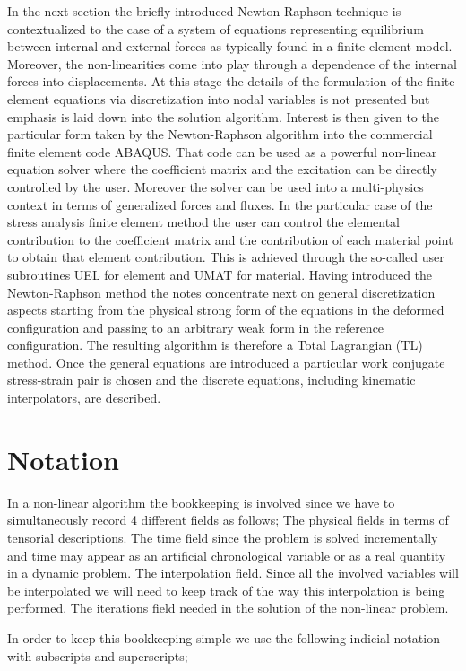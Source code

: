 In the next section the briefly introduced Newton-Raphson technique is contextualized to the case of a system of equations representing equilibrium between internal and external forces as typically found in a finite element model.  Moreover, the non-linearities come into play through a dependence of the internal forces into displacements.  At this stage the details of the formulation of the finite element equations via discretization into nodal variables is not presented but emphasis is laid down into the solution algorithm.  Interest is then given to the particular form taken by the Newton-Raphson algorithm into the commercial finite element code ABAQUS.  That code can be used as a powerful non-linear equation solver where the coefficient matrix and the excitation can be directly controlled by the user.  Moreover the solver can be used into a multi-physics context in terms of generalized forces and fluxes.  In the particular case of the stress analysis finite element method the user can control the elemental contribution to the coefficient matrix and the contribution of each material point to obtain that element contribution.  This is achieved through the so-called user subroutines UEL  for element and UMAT  for material.  Having introduced the Newton-Raphson method the notes concentrate next on general discretization aspects starting from the physical strong form of the equations in the deformed configuration and passing to an arbitrary weak form in the reference configuration.  The resulting algorithm is therefore a Total Lagrangian (TL) method.  Once the general equations are introduced a particular work conjugate stress-strain pair is chosen and the discrete equations, including kinematic interpolators, are described.

\section*{Notation}
In a non-linear algorithm the bookkeeping is involved since we have to simultaneously record 4 different fields as follows;
	The physical fields in terms of tensorial descriptions.
	The time field since the problem is solved incrementally 	and time may appear as an artificial chronological variable 	or as a real quantity in a dynamic problem.
	The interpolation field.  Since all the involved variables will be interpolated we will need to keep track of the way 	this interpolation is being performed.
	The iterations field needed in the solution of the non-linear problem.

In order to keep this bookkeeping simple we use the following indicial notation with subscripts and superscripts;


